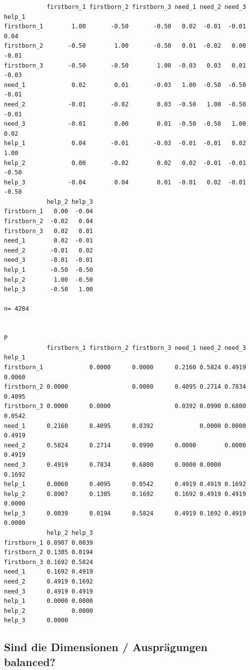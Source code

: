 \documentclass[
  letterpaper,
  DIV=11,
  numbers=noendperiod]{scrartcl}
\begin{document}
\begin{verbatim}
            firstborn_1 firstborn_2 firstborn_3 need_1 need_2 need_3 help_1
firstborn_1        1.00       -0.50       -0.50   0.02  -0.01  -0.01   0.04
firstborn_2       -0.50        1.00       -0.50   0.01  -0.02   0.00  -0.01
firstborn_3       -0.50       -0.50        1.00  -0.03   0.03   0.01  -0.03
need_1             0.02        0.01       -0.03   1.00  -0.50  -0.50  -0.01
need_2            -0.01       -0.02        0.03  -0.50   1.00  -0.50  -0.01
need_3            -0.01        0.00        0.01  -0.50  -0.50   1.00   0.02
help_1             0.04       -0.01       -0.03  -0.01  -0.01   0.02   1.00
help_2             0.00       -0.02        0.02   0.02  -0.01  -0.01  -0.50
help_3            -0.04        0.04        0.01  -0.01   0.02  -0.01  -0.50
            help_2 help_3
firstborn_1   0.00  -0.04
firstborn_2  -0.02   0.04
firstborn_3   0.02   0.01
need_1        0.02  -0.01
need_2       -0.01   0.02
need_3       -0.01  -0.01
help_1       -0.50  -0.50
help_2        1.00  -0.50
help_3       -0.50   1.00

n= 4284 


P
            firstborn_1 firstborn_2 firstborn_3 need_1 need_2 need_3 help_1
firstborn_1             0.0000      0.0000      0.2160 0.5824 0.4919 0.0060
firstborn_2 0.0000                  0.0000      0.4095 0.2714 0.7834 0.4095
firstborn_3 0.0000      0.0000                  0.0392 0.0990 0.6800 0.0542
need_1      0.2160      0.4095      0.0392             0.0000 0.0000 0.4919
need_2      0.5824      0.2714      0.0990      0.0000        0.0000 0.4919
need_3      0.4919      0.7834      0.6800      0.0000 0.0000        0.1692
help_1      0.0060      0.4095      0.0542      0.4919 0.4919 0.1692       
help_2      0.8907      0.1305      0.1692      0.1692 0.4919 0.4919 0.0000
help_3      0.0039      0.0194      0.5824      0.4919 0.1692 0.4919 0.0000
            help_2 help_3
firstborn_1 0.8907 0.0039
firstborn_2 0.1305 0.0194
firstborn_3 0.1692 0.5824
need_1      0.1692 0.4919
need_2      0.4919 0.1692
need_3      0.4919 0.4919
help_1      0.0000 0.0000
help_2             0.0000
help_3      0.0000       
\end{verbatim}

\subsection{Sind die Dimensionen / Ausprägungen
balanced?}\label{sind-die-dimensionen-auspruxe4gungen-balanced}
\end{document}
